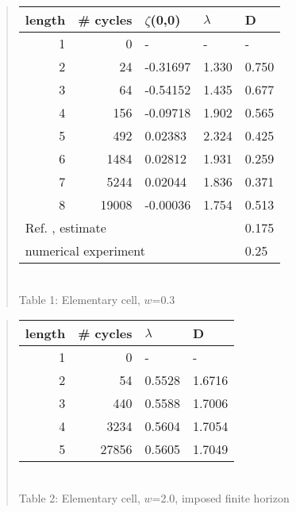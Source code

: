 \newpage

\begin{quote} \begin{center}
\begin{tabular}{|r|r|l|l|l|}
\hline
length & \# cycles & $\zeta$(0,0) & $\lambda$ & D \\ \hline\hline
1      & 0      &   -    &   -  &   - \\
2      & 24     & -0.31697 & 1.330 & 0.750\\
3      & 64     & -0.54152 & 1.435 & 0.677\\
4      & 156    & -0.09718 & 1.902 & 0.565\\
5      & 492    &  0.02383 & 2.324 & 0.425\\
6      & 1484   &  0.02812 & 1.931 & 0.259\\
7      & 5244   &  0.02044 & 1.836 & 0.371\\
8      & 19008  & -0.00036 & 1.754 & 0.513\\ \hline\hline
\multicolumn{4}{|l|}{Ref. \cite{MZ}, estimate} & 0.175 \\
\multicolumn{4}{|l|}{numerical experiment} & 0.25 \\ \hline
\end{tabular}\\[10pt]
{Table 1: Elementary cell, $w$=0.3}
\end{center}\end{quote}
\eject

\begin{quote} \begin{center}
\begin{tabular}{|r|r|l|l|}
\hline
length & \# cycles & $\lambda$ & D \\ \hline\hline
1      & 0      &   -    &    - \\
2 &     54      & 0.5528 &  1.6716\\
3 &    440      & 0.5588 &  1.7006\\
4 &   3234      & 0.5604 &  1.7054\\
5 &  27856      & 0.5605 &  1.7049\\ \hline
\end{tabular}\\[10pt]
{Table 2: Elementary cell, $w$=2.0, imposed finite horizon}
\end{center}\end{quote}
\eject

